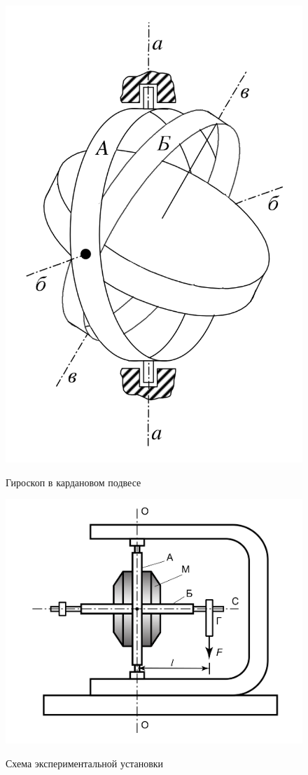 \documentclass[a4paper,12pt]{article} %
\begin{document}
\begin{figure} [h]
  \includegraphics[scale=0.3]{./125/рис 2.png} \label{pic:2}
  \caption[Рис. 2]{Гироскоп в кардановом подвесе}
  \includegraphics[scale=0.3]{./125/рис 3.png} \label{pic:3}
  \caption[Рис. 3]{Схема экспериментальной установки}
\end{figure}
\end{document}

